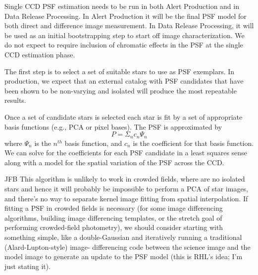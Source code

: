 Single CCD PSF estimation needs to be run in both Alert Production and in Data Release Processing.  In Alert Production it will be the final PSF model for both direct and difference image measurement.  In Data Release Processing, it will be used as an initial bootstrapping step to start off image characterization.  We do not expect to require inclusion of chromatic effects in the PSF at the single CCD estimation phase.

The first step is to select a set of suitable stars to use as PSF exemplars.  In production, we expect that an external catalog with PSF candidates that have been shown to be non-varying and isolated will produce the most repeatable results.

Once a set of candidate stars is selected each star is fit by a set of
appropriate basis functions (e.g., PCA or pixel bases).  The PSF is approximated by
\[
P = \Sigma_n c_n\Psi_n
\]
where $\Psi_n$ is the $n^{th}$ basis function, and $c_n$ is the coefficient for that basis function.  We can solve for the coefficients for each PSF candidate in a least squares sense along with a model for the spatial variation of the PSF
across the CCD.

\begin{note}{JFB}
    This algorithm is unlikely to work in crowded fields, where are no
    isolated stars and hence it will probably be impossible to perform a PCA
    of star images, and there's no way to separate kernel image fitting from
    spatial interpolation.  If fitting a PSF in crowded fields is necessary
    (for some image differencing algorithms, building image differencing
    templates, or the stretch goal of performing crowded-field photometry),
    we should consider starting with something simple, like a double-Gaussian
    and iteratively running a traditional (Alard-Lupton-style) image-
    differencing code between the science image and the model image to
    generate an update to the PSF model (this is RHL's idea; I'm just stating
    it).
\end{note}

